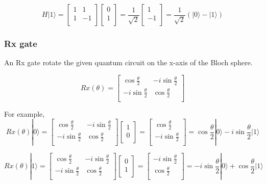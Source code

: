 $$ H|1\rangle = \begin{bmatrix}
1 & 1\\
1 & -1 \\
\end{bmatrix} 
\left[
\begin{array}{c}
0 \\
1  \\
\end{array}
\right]
= \frac{1}{\sqrt{2}} \left[
\begin{array}{c}
1 \\
-1 \\
\end{array}
\right]
=\frac{1}{\sqrt{2}} (|0\rangle - |1\rangle)
$$

\subsubsection{Rx gate}
 An Rx gate rotate the given quantum circuit on the x-axis of the Bloch sphere.
 
 $$ Rx(\theta) = \begin{bmatrix}
\cos{\frac{\theta}{2}} & -i\sin{\frac{\theta}{2}} \\
 -i\sin{\frac{\theta}{2}} & \cos{\frac{\theta}{2}}  \\
\end{bmatrix}
$$
 
 For example,
$$ Rx(\theta)|0\rangle = \begin{bmatrix}
\cos{\frac{\theta}{2}} & -i\sin{\frac{\theta}{2}} \\
 -i\sin{\frac{\theta}{2}} & \cos{\frac{\theta}{2}}  \\
\end{bmatrix}\left[
\begin{array}{c}
1 \\
0 \\
\end{array}
\right]
=  \left[
\begin{array}{c}
\cos{\frac{\theta}{2}} \\
-i\sin{\frac{\theta}{2}} \\
\end{array}
\right]
= \cos{\frac{\theta}{2}}|0\rangle -i \sin{\frac{\theta}{2}} |1\rangle
$$

$$ Rx(\theta)|1\rangle = \begin{bmatrix}
\cos{\frac{\theta}{2}} & -i\sin{\frac{\theta}{2}} \\
 -i\sin{\frac{\theta}{2}} & \cos{\frac{\theta}{2}}  \\
\end{bmatrix}\left[
\begin{array}{c}
0 \\
1 \\
\end{array}
\right]
=  \left[
\begin{array}{c}
 -i\sin{\frac{\theta}{2}} \\
\cos{\frac{\theta}{2}}\\
\end{array}
\right]
=-i \sin{\frac{\theta}{2}}|0\rangle + \cos{\frac{\theta}{2}}|1\rangle
$$

